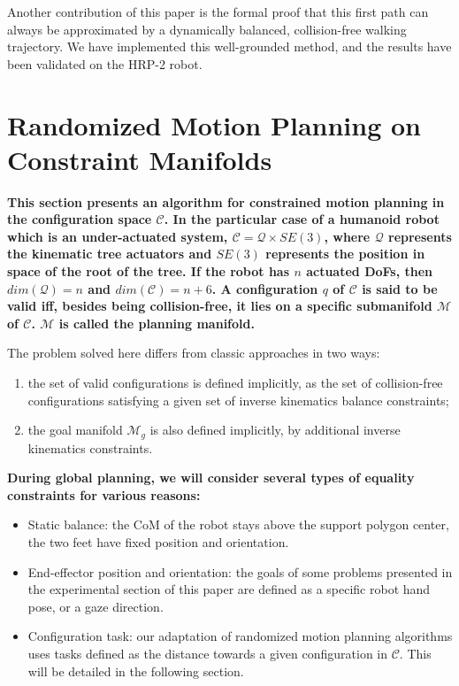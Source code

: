 \documentclass{article}
\newcommand\manifold{\mathcal{M}}
\newcommand\goalmanifold{\mathcal{M}_{g}}
\begin{document}
Another contribution of this paper is the formal proof that this first
path can always be approximated by a dynamically balanced,
collision-free walking trajectory. We have implemented this
well-grounded method, and the results have been validated on the HRP-2
robot.

\section{Randomized Motion Planning on Constraint Manifolds}
\label{sec:wb}

\textbf{This section presents an algorithm for constrained motion
  planning in the configuration space $\mathcal{C}$. In the particular
  case of a humanoid robot which is an under-actuated system,
  $\mathcal{C}=\mathcal{Q} \times SE(3)$, where $\mathcal{Q}$
  represents the kinematic tree actuators and $SE(3)$ represents the
  position in space of the root of the tree. If the robot has $n$
  actuated DoFs, then $dim(\mathcal{Q})=n$ and
  $dim(\mathcal{C})=n+6$. A configuration $q$ of $\mathcal{C}$ is said
  to be valid iff, besides being collision-free, it lies on a specific
  submanifold $\manifold$ of $\mathcal{C}$. $\manifold$ is called the
  planning manifold.}

The problem solved here differs from classic approaches in two ways:
\begin{enumerate}
\item the set of valid configurations is defined implicitly, as the
  set of collision-free configurations satisfying a given set of
  inverse kinematics balance constraints;
\item the goal manifold $\goalmanifold$ is also defined implicitly,
  by additional inverse kinematics constraints.
\end{enumerate}
\textbf{During global planning, we will consider several types of
equality constraints for various reasons:}
\begin{itemize}
\item Static balance: the CoM of the robot stays above
  the support polygon center, the two feet have fixed position and
  orientation.
\item End-effector position and orientation: the goals of some problems presented
  in the experimental section of this paper are defined as a specific robot hand pose,
  or a gaze direction.
\item Configuration task: our adaptation of randomized motion planning algorithms 
  uses tasks defined as the distance towards a given configuration in $\mathcal{C}$. 
  This will be detailed in the following section.
\end{itemize}
\end{document}
